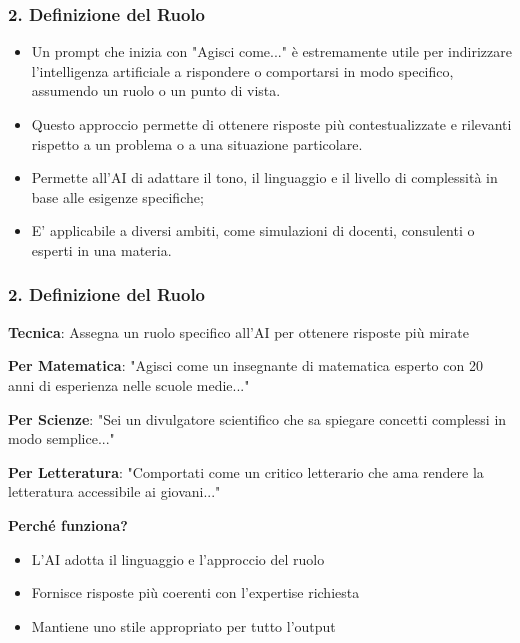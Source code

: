 \documentclass[aspectratio=169]{beamer}
\begin{document}
\begin{frame}
\frametitle{2. Definizione del Ruolo}
\begin{itemize}
\normalsize
\item Un prompt che inizia con "Agisci come..." è estremamente utile per indirizzare l'intelligenza artificiale a rispondere o comportarsi in modo specifico, assumendo un ruolo o un punto di vista. 
\item Questo approccio permette di ottenere risposte più contestualizzate e rilevanti rispetto a un problema o a una situazione particolare. 
\item Permette all'AI di adattare il tono, il linguaggio e il livello di complessità in base alle esigenze specifiche; 
\item E' applicabile a diversi ambiti, come simulazioni di docenti, consulenti o esperti in una materia.
\end{itemize}
\end{frame}
%
%
\begin{frame}
\frametitle{2. Definizione del Ruolo}
\textbf{Tecnica}: Assegna un ruolo specifico all'AI per ottenere risposte più mirate

\begin{examplebox}
\textbf{Per Matematica}: "Agisci come un insegnante di matematica esperto con 20 anni di esperienza nelle scuole medie..."

\textbf{Per Scienze}: "Sei un divulgatore scientifico che sa spiegare concetti complessi in modo semplice..."

\textbf{Per Letteratura}: "Comportati come un critico letterario che ama rendere la letteratura accessibile ai giovani..."
\end{examplebox}

\pause
\textbf{Perché funziona?}
\begin{itemize}
    \item L'AI adotta il linguaggio e l'approccio del ruolo
    \item Fornisce risposte più coerenti con l'expertise richiesta
    \item Mantiene uno stile appropriato per tutto l'output
\end{itemize}
\end{frame}
%
%
\end{document}
